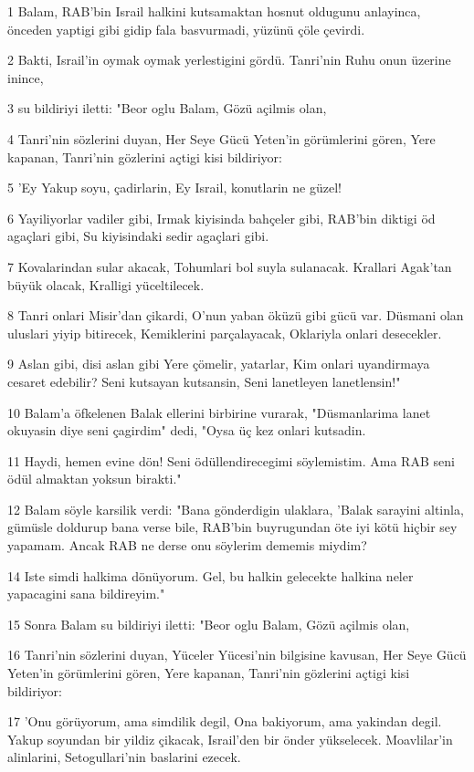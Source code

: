 \par 1 Balam, RAB'bin Israil halkini kutsamaktan hosnut oldugunu anlayinca, önceden yaptigi gibi gidip fala basvurmadi, yüzünü çöle çevirdi.
\par 2 Bakti, Israil'in oymak oymak yerlestigini gördü. Tanri'nin Ruhu onun üzerine inince,
\par 3 su bildiriyi iletti: "Beor oglu Balam, Gözü açilmis olan,
\par 4 Tanri'nin sözlerini duyan, Her Seye Gücü Yeten'in görümlerini gören, Yere kapanan, Tanri'nin gözlerini açtigi kisi bildiriyor:
\par 5 'Ey Yakup soyu, çadirlarin, Ey Israil, konutlarin ne güzel!
\par 6 Yayiliyorlar vadiler gibi, Irmak kiyisinda bahçeler gibi, RAB'bin diktigi öd agaçlari gibi, Su kiyisindaki sedir agaçlari gibi.
\par 7 Kovalarindan sular akacak, Tohumlari bol suyla sulanacak. Krallari Agak'tan büyük olacak, Kralligi yüceltilecek.
\par 8 Tanri onlari Misir'dan çikardi, O'nun yaban öküzü gibi gücü var. Düsmani olan uluslari yiyip bitirecek, Kemiklerini parçalayacak, Oklariyla onlari desecekler.
\par 9 Aslan gibi, disi aslan gibi Yere çömelir, yatarlar, Kim onlari uyandirmaya cesaret edebilir? Seni kutsayan kutsansin, Seni lanetleyen lanetlensin!"
\par 10 Balam'a öfkelenen Balak ellerini birbirine vurarak, "Düsmanlarima lanet okuyasin diye seni çagirdim" dedi, "Oysa üç kez onlari kutsadin.
\par 11 Haydi, hemen evine dön! Seni ödüllendirecegimi söylemistim. Ama RAB seni ödül almaktan yoksun birakti."
\par 12 Balam söyle karsilik verdi: "Bana gönderdigin ulaklara, 'Balak sarayini altinla, gümüsle doldurup bana verse bile, RAB'bin buyrugundan öte iyi kötü hiçbir sey yapamam. Ancak RAB ne derse onu söylerim dememis miydim?
\par 14 Iste simdi halkima dönüyorum. Gel, bu halkin gelecekte halkina neler yapacagini sana bildireyim."
\par 15 Sonra Balam su bildiriyi iletti: "Beor oglu Balam, Gözü açilmis olan,
\par 16 Tanri'nin sözlerini duyan, Yüceler Yücesi'nin bilgisine kavusan, Her Seye Gücü Yeten'in görümlerini gören, Yere kapanan, Tanri'nin gözlerini açtigi kisi bildiriyor:
\par 17 'Onu görüyorum, ama simdilik degil, Ona bakiyorum, ama yakindan degil. Yakup soyundan bir yildiz çikacak, Israil'den bir önder yükselecek. Moavlilar'in alinlarini, Setogullari'nin baslarini ezecek.
